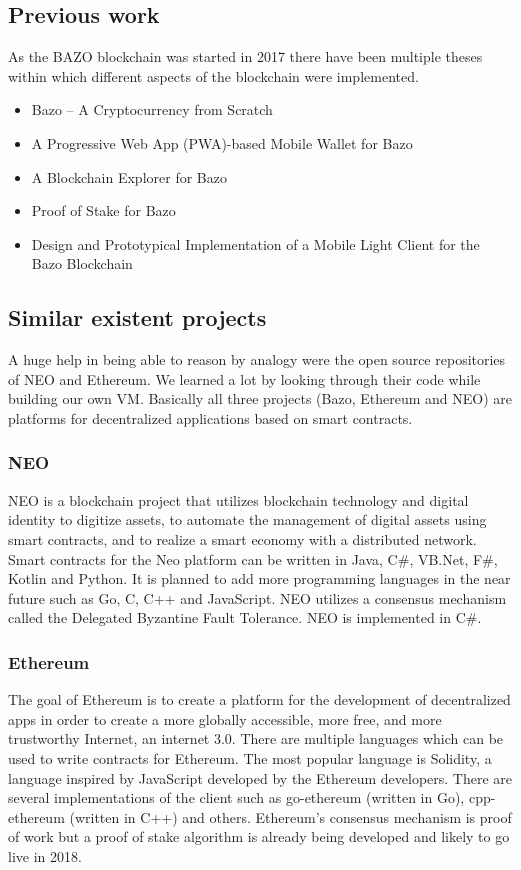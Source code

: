 \subsection{Previous work}
As the BAZO blockchain was started in 2017 there have been multiple theses within which different aspects of the blockchain were implemented. 
\begin{itemize}
	\item Bazo – A Cryptocurrency from Scratch \cite{ba_miner}
	\item A Progressive Web App (PWA)-based Mobile Wallet for Bazo \cite{ba_wallet}
	\item A Blockchain Explorer for Bazo \cite{ba_explorer}
	\item Proof of Stake for Bazo \cite{ba_pos}
	\item Design and Prototypical Implementation of a Mobile Light Client for the Bazo Blockchain \cite{ba_client}
\end{itemize}

\subsection{Similar existent projects}
A huge help in being able to reason by analogy were the open source repositories of NEO and Ethereum. We learned a lot by looking through their code while building our own VM. Basically all three projects (Bazo, Ethereum and NEO) are platforms for decentralized applications based on smart contracts. 

\subsubsection{NEO}
NEO is a blockchain project \flqq that utilizes blockchain technology and digital identity to digitize assets, to automate the management of digital assets using smart contracts, and to realize a smart economy with a distributed network.\frqq \cite{neovseth} Smart contracts for the Neo platform can be written in Java, C\#, VB.Net, F\#, Kotlin and Python. It is planned to add more programming languages in the near future such as Go, C, C++ and JavaScript. NEO utilizes a consensus mechanism called the Delegated Byzantine Fault Tolerance. NEO is implemented in C\#. \cite{neo_whitepaper}

\subsubsection{Ethereum}
The goal of Ethereum is to create a platform for the development of decentralized apps in order to create a \flqq more globally accessible, more free, and more trustworthy Internet, an internet 3.0\frqq. \cite{neovseth} There are multiple languages which can be used to write contracts for Ethereum. The most popular language is Solidity, a language inspired by JavaScript developed by the Ethereum developers. There are several implementations of the client such as go-ethereum (written in Go), cpp-ethereum (written in C++) and others. Ethereum's consensus mechanism is proof of work but  a proof of stake algorithm is already being developed and likely to go live in 2018.

